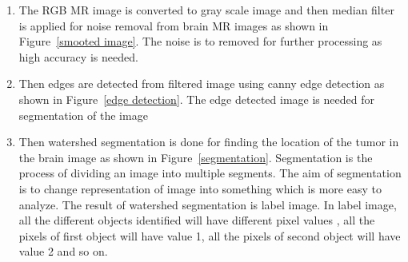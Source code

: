 \documentclass[11pt]{article}
\begin{document}
	\begin{enumerate}
		\item The  RGB  MR    image  is  converted  to  gray  scale image  and
			then  median  filter  is  applied  for  noise  removal from brain MR
			images as shown in Figure~\ref{smooted image}. The noise is to removed for further
			processing as high accuracy is needed.

		\item Then  edges  are  detected  from  filtered  image  using canny
			edge  detection  as  shown  in  Figure~\ref{edge detection}.  The  edge detected
			image is needed for segmentation of  the image

		\item Then  watershed  segmentation  is  done  for  finding the
			location  of  the  tumor  in  the  brain  image  as  shown  in
			Figure~\ref{segmentation}. Segmentation is  the process of dividing  an image into
			multiple segments. The aim of segmentation is to change
			representation  of    image  into  something  which  is more  easy
			to  analyze.  The result  of  watershed  segmentation is  label
			image.    In  label  image,  all  the  different  objects identified
			will  have  different  pixel  values  ,  all  the  pixels  of first
			object  will have value 1, all the pixels of second object will have
			value 2 and so on.
	\end{enumerate}
\end{document}
